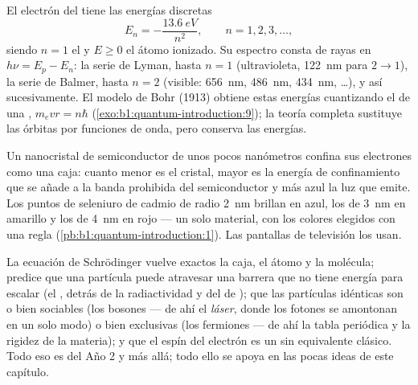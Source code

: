 \begin{proposition}\label{prop:b1:quantum-introduction:hydrogen}
El electrón del  tiene las energías discretas
\[
E_n = -\frac{\qty{13.6}{eV}}{n^2} , \qquad n = 1, 2, 3, \ldots ,
\]
siendo $n = 1$ el  y $E \geq 0$ el átomo ionizado. Su
espectro consta de rayas en $h\nu = E_p - E_n$: la serie de Lyman, hasta
$n = 1$ (ultravioleta, \qty{122}{nm} para $2 \to 1$), la serie de Balmer,
hasta $n = 2$ (visible: \qty{656}{nm}, \qty{486}{nm}, \qty{434}{nm}, \ldots),
y así sucesivamente. El modelo de Bohr (1913) obtiene estas energías
cuantizando el  de una , $m_evr = n\hbar$
(\cref{exo:b1:quantum-introduction:9}); la teoría completa sustituye las
órbitas por funciones de onda, pero conserva las energías.
\end{proposition}
\admitted

\begin{example}\label{ex:b1:quantum-introduction:dot}
Un nanocristal de semiconductor de unos pocos nanómetros confina sus
electrones como una caja: cuanto menor es el cristal, mayor es la energía
de confinamiento que se añade a la banda prohibida del semiconductor y
más azul la luz que emite. Los puntos de seleniuro de cadmio de radio
\qty{2}{nm} brillan en azul, los de \qty{3}{nm} en amarillo y los de
\qty{4}{nm} en rojo --- un solo material, con los colores elegidos con
una regla (\cref{pb:b1:quantum-introduction:1}). Las pantallas de
televisión los usan.
\end{example}

\begin{remark}\label{rem:b1:quantum-introduction:rest}
La ecuación de Schrödinger vuelve exactos la caja, el átomo y la
molécula; predice que una partícula puede atravesar una barrera que no
tiene energía para escalar (el \emph{}, detrás de la
radiactividad y del  de ); que las partículas
idénticas son o bien sociables (los bosones --- de ahí el \emph{láser},
donde los fotones se amontonan en un solo modo) o bien exclusivas (los
fermiones --- de ahí la tabla periódica y la rigidez de la materia); y
que el espín del electrón es un  sin equivalente
clásico. Todo eso es del Año 2 y más allá; todo ello se apoya en las
pocas ideas de este capítulo.
\end{remark}

